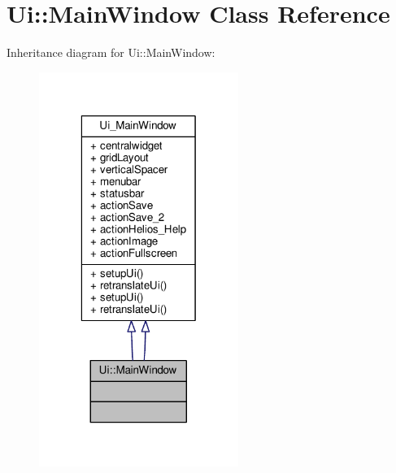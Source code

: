 \hypertarget{class_ui_1_1_main_window}{\section{Ui\-:\-:Main\-Window Class Reference}
\label{class_ui_1_1_main_window}
}


Inheritance diagram for Ui\-:\-:Main\-Window\-:
\nopagebreak
\begin{figure}[H]
\begin{center}
\leavevmode
\includegraphics[width=184pt]{class_ui_1_1_main_window__inherit__graph}
\end{center}
\end{figure}


